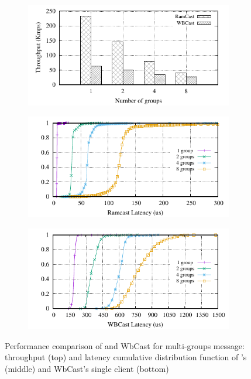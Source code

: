 \begin{figure}[htp!]
  \begin{subfigure}{\columnwidth}
    \advance\leftskip-0.1cm
    \includegraphics[width=0.99\columnwidth]{figures/benchmark/graphs/figure-multi-dest-compare-throughput}
  \end{subfigure}
  \begin{subfigure}{\columnwidth}
    \centering
    \includegraphics[width=0.95\columnwidth]{figures/benchmark/graphs/figure-multi-dest-compare-latency-cdf-ramcast}
  \end{subfigure}
  \begin{subfigure}{\columnwidth}
    \centering
    \includegraphics[width=0.95\columnwidth]{figures/benchmark/graphs/figure-multi-dest-compare-latency-cdf-wbcast}
  \end{subfigure}
  \caption{Performance comparison of \libname and WbCast for multi-groups message: throughput (top) and latency cumulative distribution function of \libname's (middle) and WbCast's single client (bottom)}
  \label{fig:multicast-multi-group}
\end{figure}
